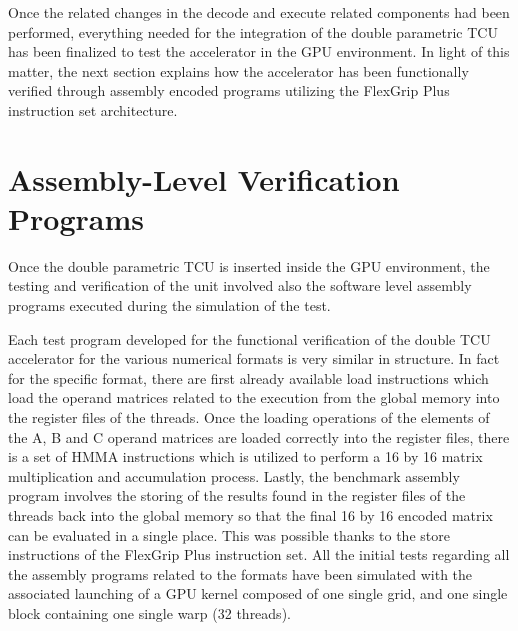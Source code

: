 Once the related changes in the decode and execute related components had been performed, everything needed for the integration of the double parametric TCU has been finalized to test the accelerator in the GPU environment. In light of this matter, the next section explains how the accelerator has been functionally verified through assembly encoded programs utilizing the FlexGrip Plus instruction set architecture.

\section{Assembly-Level Verification Programs}





Once the double parametric TCU is inserted inside the GPU environment, the testing and verification of the unit involved also the software level assembly programs executed during the simulation of the test. 

Each test program developed for the functional verification of the double TCU accelerator for the various numerical formats is very similar in structure. In fact for the specific format, there are first already available load instructions which load the operand matrices related to the execution from the global memory into the register files of the threads. Once the loading operations of the elements of the A, B and C operand matrices are loaded correctly into the register files, there is a set of HMMA instructions which is utilized to perform a 16 by 16 matrix multiplication and accumulation process. Lastly, the benchmark assembly program involves the storing of the results found in the register files of the threads back into the global memory so that the final 16 by 16 encoded matrix can be evaluated in a single place. This was possible thanks to the store instructions of the FlexGrip Plus instruction set.  All the initial tests regarding all the assembly programs related to the formats have been simulated with the associated launching of a GPU kernel composed of one single grid, and one single block containing one single warp (32 threads).


